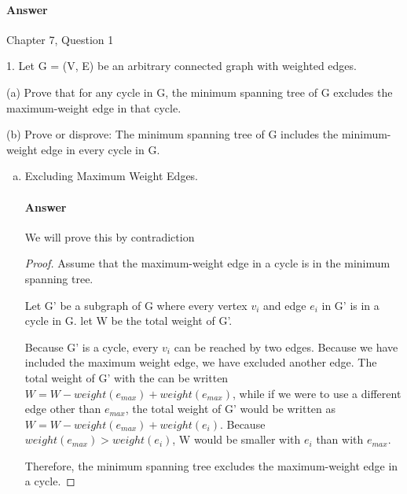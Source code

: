 \documentclass{article}
\begin{document}
\paragraph{Answer}
\todo{}

\collab{\todo{}}

Chapter 7, Question 1

1. Let G = (V, E) be an arbitrary connected graph with weighted edges.

(a) Prove that for any cycle in G, the minimum spanning tree of G excludes
the maximum-weight edge in that cycle.

(b) Prove or disprove: The minimum spanning tree of G includes the
minimum-weight edge in every cycle in G.

\begin{enumerate}[(a)]

    \item Excluding Maximum Weight Edges.

        \paragraph{Answer}

        We will prove this by contradiction

        \begin{proof}

            Assume that the maximum-weight edge in a cycle is in the minimum spanning
            tree.

            Let G' be a subgraph of G where every vertex $v_{i}$ and edge $e_{i}$ in G'
            is in a cycle in G. let W be the total weight of G'.

            Because G' is a cycle, every $v_{i}$ can be reached by two edges.
            Because we have included the maximum weight edge, we have excluded
            another edge. The total weight of G' with the can be written $W = W -
            weight(e_{max}) + weight(e_{max})$, while if we were to use a different
            edge other than $e_{max}$, the total weight of G' would be written as
            $W = W - weight(e_{max}) + weight(e_{i})$. Because $weight(e_{max}) > weight(e_{i})$, W would be smaller with $e_{i}$ than with $e_{max}$.

            Therefore, the minimum spanning tree excludes the maximum-weight
            edge in a cycle.

        \end{proof}



\end{enumerate}
\end{document}
